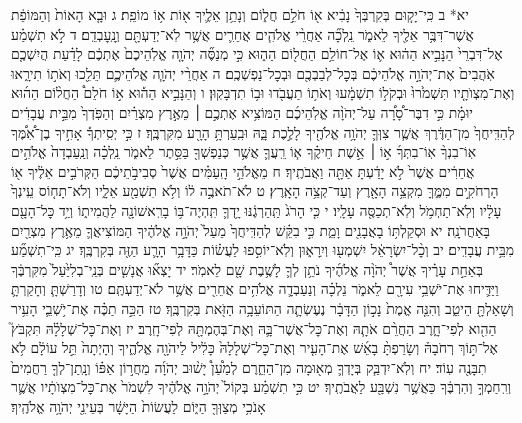\documentclass[twoside, openany, parskip=half, 11pt]{book}
\begin{document}
יא* ב כִּֽי־יָק֤וּם בְּקִרְבְּךָ֙ נָבִ֔יא א֖וֹ חֹלֵ֣ם חֲל֑וֹם וְנָתַ֥ן אֵלֶ֛יךָ א֖וֹת א֥וֹ מוֹפֵֽת׃ ג וּבָ֤א הָאוֹת֙ וְהַמּוֹפֵ֔ת אֲשֶׁר־דִּבֶּ֥ר אֵלֶ֖יךָ לֵאמֹ֑ר נֵֽלְכָ֞ה אַחֲרֵ֨י אֱלֹהִ֧ים אֲחֵרִ֛ים אֲשֶׁ֥ר לֹֽא־יְדַעְתָּ֖ם וְנׇֽעׇבְדֵֽם׃ ד לֹ֣א תִשְׁמַ֗ע אֶל־דִּבְרֵי֙ הַנָּבִ֣יא הַה֔וּא א֛וֹ אֶל־חוֹלֵ֥ם הַחֲל֖וֹם הַה֑וּא כִּ֣י מְנַסֶּ֞ה יְהֹוָ֤ה אֱלֹֽהֵיכֶם֙ אֶתְכֶ֔ם לָדַ֗עַת הֲיִשְׁכֶ֤ם אֹֽהֲבִים֙ אֶת־יְהֹוָ֣ה אֱלֹהֵיכֶ֔ם בְּכׇל־לְבַבְכֶ֖ם וּבְכׇל־נַפְשְׁכֶֽם׃ ה אַחֲרֵ֨י יְהֹוָ֧ה אֱלֹהֵיכֶ֛ם תֵּלֵ֖כוּ וְאֹת֣וֹ תִירָ֑אוּ וְאֶת־מִצְוֺתָ֤יו תִּשְׁמֹ֙רוּ֙ וּבְקֹל֣וֹ תִשְׁמָ֔עוּ וְאֹת֥וֹ תַעֲבֹ֖דוּ וּב֥וֹ תִדְבָּקֽוּן׃ ו וְהַנָּבִ֣יא הַה֡וּא א֣וֹ חֹלֵם֩ הַחֲל֨וֹם הַה֜וּא יוּמָ֗ת כִּ֣י דִבֶּר־סָ֠רָ֠ה עַל־יְהֹוָ֨ה אֱלֹֽהֵיכֶ֜ם הַמּוֹצִ֥יא אֶתְכֶ֣ם ׀ מֵאֶ֣רֶץ מִצְרַ֗יִם וְהַפֹּֽדְךָ֙ מִבֵּ֣ית עֲבָדִ֔ים לְהַדִּֽיחֲךָ֙ מִן־הַדֶּ֔רֶךְ אֲשֶׁ֧ר צִוְּךָ֛ יְהֹוָ֥ה אֱלֹהֶ֖יךָ לָלֶ֣כֶת בָּ֑הּ וּבִֽעַרְתָּ֥ הָרָ֖ע מִקִּרְבֶּֽךָ׃
ז כִּ֣י יְסִֽיתְךָ֡ אָחִ֣יךָ בֶן־אִ֠מֶּ֠ךָ אֽוֹ־בִנְךָ֨ אֽוֹ־בִתְּךָ֜ א֣וֹ ׀ אֵ֣שֶׁת חֵיקֶ֗ךָ א֧וֹ רֵֽעֲךָ֛ אֲשֶׁ֥ר כְּנַפְשְׁךָ֖ בַּסֵּ֣תֶר לֵאמֹ֑ר נֵֽלְכָ֗ה וְנַֽעַבְדָה֙ אֱלֹהִ֣ים אֲחֵרִ֔ים אֲשֶׁר֙ לֹ֣א יָדַ֔עְתָּ אַתָּ֖ה וַאֲבֹתֶֽיךָ׃ ח מֵאֱלֹהֵ֣י הָֽעַמִּ֗ים אֲשֶׁר֙ סְבִיבֹ֣תֵיכֶ֔ם הַקְּרֹבִ֣ים אֵלֶ֔יךָ א֖וֹ הָרְחֹקִ֣ים מִמֶּ֑ךָּ מִקְצֵ֥ה הָאָ֖רֶץ וְעַד־קְצֵ֥ה הָאָֽרֶץ׃ ט לֹא־תֹאבֶ֣ה ל֔וֹ וְלֹ֥א תִשְׁמַ֖ע אֵלָ֑יו וְלֹא־תָח֤וֹס עֵֽינְךָ֙ עָלָ֔יו וְלֹֽא־תַחְמֹ֥ל וְלֹֽא־תְכַסֶּ֖ה עָלָֽיו׃ י כִּ֤י הָרֹג֙ תַּֽהַרְגֶ֔נּוּ יָ֥דְךָ֛ תִּֽהְיֶה־בּ֥וֹ בָרִֽאשׁוֹנָ֖ה לַהֲמִית֑וֹ וְיַ֥ד כׇּל־הָעָ֖ם בָּאַחֲרֹנָֽה׃ יא וּסְקַלְתּ֥וֹ בָאֲבָנִ֖ים וָמֵ֑ת כִּ֣י בִקֵּ֗שׁ לְהַדִּֽיחֲךָ֙ מֵעַל֙ יְהֹוָ֣ה אֱלֹהֶ֔יךָ הַמּוֹצִיאֲךָ֛ מֵאֶ֥רֶץ מִצְרַ֖יִם מִבֵּ֥ית עֲבָדִֽים׃ יב וְכׇ֨ל־יִשְׂרָאֵ֔ל יִשְׁמְע֖וּ וְיִֽרָא֑וּן וְלֹֽא־יוֹסִ֣פוּ לַעֲשׂ֗וֹת כַּדָּבָ֥ר הָרָ֛ע הַזֶּ֖ה בְּקִרְבֶּֽךָ׃
יג כִּֽי־תִשְׁמַ֞ע בְּאַחַ֣ת עָרֶ֗יךָ אֲשֶׁר֩ יְהֹוָ֨ה אֱלֹהֶ֜יךָ נֹתֵ֥ן לְךָ֛ לָשֶׁ֥בֶת שָׁ֖ם לֵאמֹֽר׃ יד יָצְא֞וּ אֲנָשִׁ֤ים בְּנֵֽי־בְלִיַּ֙עַל֙ מִקִּרְבֶּ֔ךָ וַיַּדִּ֛יחוּ אֶת־יֹשְׁבֵ֥י עִירָ֖ם לֵאמֹ֑ר נֵלְכָ֗ה וְנַעַבְדָ֛ה אֱלֹהִ֥ים אֲחֵרִ֖ים אֲשֶׁ֥ר לֹא־יְדַעְתֶּֽם׃ טו וְדָרַשְׁתָּ֧ וְחָקַרְתָּ֛ וְשָׁאַלְתָּ֖ הֵיטֵ֑ב וְהִנֵּ֤ה אֱמֶת֙ נָכ֣וֹן הַדָּבָ֔ר נֶעֶשְׂתָ֛ה הַתּוֹעֵבָ֥ה הַזֹּ֖את בְּקִרְבֶּֽךָ׃ טז הַכֵּ֣ה תַכֶּ֗ה אֶת־יֹ֥שְׁבֵ֛י הָעִ֥יר הַהִ֖וא לְפִי־חָ֑רֶב הַחֲרֵ֨ם אֹתָ֧הּ וְאֶת־כׇּל־אֲשֶׁר־בָּ֛הּ וְאֶת־בְּהֶמְתָּ֖הּ לְפִי־חָֽרֶב׃ יז וְאֶת־כׇּל־שְׁלָלָ֗הּ תִּקְבֹּץ֮ אֶל־תּ֣וֹךְ רְחֹבָהּ֒ וְשָׂרַפְתָּ֨ בָאֵ֜שׁ אֶת־הָעִ֤יר וְאֶת־כׇּל־שְׁלָלָהּ֙ כָּלִ֔יל לַיהֹוָ֖ה אֱלֹהֶ֑יךָ וְהָיְתָה֙ תֵּ֣ל עוֹלָ֔ם לֹ֥א תִבָּנֶ֖ה עֽוֹד׃ יח וְלֹֽא־יִדְבַּ֧ק בְּיָדְךָ֛ מְא֖וּמָה מִן־הַחֵ֑רֶם לְמַ֩עַן֩ יָשׁ֨וּב יְהֹוָ֜ה מֵחֲר֣וֹן אַפּ֗וֹ וְנָֽתַן־לְךָ֤ רַחֲמִים֙ וְרִֽחַמְךָ֣ וְהִרְבֶּ֔ךָ כַּאֲשֶׁ֥ר נִשְׁבַּ֖ע לַאֲבֹתֶֽיךָ׃ יט כִּ֣י תִשְׁמַ֗ע בְּקוֹל֙ יְהֹוָ֣ה אֱלֹהֶ֔יךָ לִשְׁמֹר֙ אֶת־כׇּל־מִצְוֺתָ֔יו אֲשֶׁ֛ר אָנֹכִ֥י מְצַוְּךָ֖ הַיּ֑וֹם לַעֲשׂוֹת֙ הַיָּשָׁ֔ר בְּעֵינֵ֖י יְהֹוָ֥ה אֱלֹהֶֽיךָ׃
\end{document}
